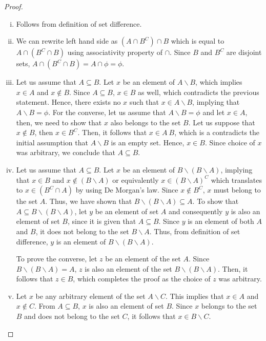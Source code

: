\documentclass[a4paper,english,12pt]{article}
\begin{document}
\begin{proof}
\begin{enumerate} [i)]
 \item Follows from definition of set difference.
 \item We can rewrite left hand side as $(A \cap B^{C}) \cap B$ which is equal to 
 $A \cap (B^{C} \cap B)$ using associativity property of $\cap$. Since $B$ and $B^{C}$ are disjoint sets, $A \cap (B^{C} \cap B) = A \cap \phi = \phi$. 
 \item Let us assume that $A \subseteq B$. Let $x$ be an element of $A \backslash B$, which implies $x \in A$ and $x \notin B$. Since $A \subseteq B$, $x \in B$ as well, which contradicts the previous  statement. Hence, there exists no $x$ such that $x \in A \backslash B$, implying that $A \backslash B = \phi$.  For the converse, let us assume that $A \backslash B = \phi$ and let $x \in A$, then, we need to show that $x$ also belongs to the set $B$. Let us suppose that $x \notin B$, then $x \in B^{C}$. Then, it follows that $x \in A \ B$, which is a contradicts the initial assumption that 
 $A \backslash B$ is an empty set. Hence, $x \in B$. Since choice of $x$ was arbitrary, we conclude that $A \subseteq B$.    
 \item Let us assume that $A \subseteq B$. Let $x$ be an element of $B \backslash (B \backslash A)$, implying that $x \in B$ and $x \notin (B \backslash A)$ or equivalently $x \in (B \backslash A)^{C}$
 which translates to $x \in (B^{C} \cap A)$ by using De Morgan's law. Since $x \notin B^{C}$, $x$ must belong to the set $A$. Thus, we have shown that $B \backslash (B \backslash A) \subseteq A$.
To show that $A \subseteq B \backslash (B \backslash A)$, let $y$ be an element of set $A$ and consequently $y$ is also an element of set $B$, since it is given that $A \subseteq B$. Since $y$ is an element of both $A$ and $B$, it does not belong to the set $B \backslash A$. Thus, from definition of set difference, $y$ is an element of $B \backslash (B \backslash A)$.

To prove the converse, let $z$ be an element of the set $A$. Since $B \backslash (B \backslash A) = A$, $z$ is also an element of the set $B \backslash (B \backslash A)$. Then, it follows that $z \in B$, which completes the proof as the choice of $z$ was arbitrary.
 
\item Let $x$ be any arbitrary element of the set $A \backslash C$. This implies that $x \in A$ and $x \notin C$. From $A \subseteq B$, $x $ is also an element of set $B$. Since $x$ belongs to the set $B$ and does not belong to the set $C$, it follows that $x \in B \backslash C$. 


\end{enumerate}
\end{proof}
\end{document}
